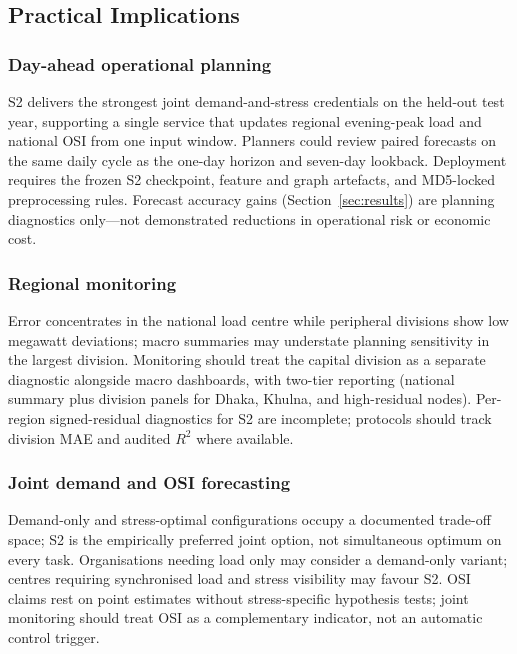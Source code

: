 \subsection{Practical Implications}\label{subsection:practical_implications}

\subsubsection{Day-ahead operational planning}\label{subsubsection:day_ahead_operational_planning}

S2 delivers the strongest joint demand-and-stress credentials on the held-out test year, supporting a single service that updates regional evening-peak load and national OSI from one input window. Planners could review paired forecasts on the same daily cycle as the one-day horizon and seven-day lookback. Deployment requires the frozen S2 checkpoint, feature and graph artefacts, and MD5-locked preprocessing rules. Forecast accuracy gains (Section~\ref{sec:results}) are planning diagnostics only---not demonstrated reductions in operational risk or economic cost.

\subsubsection{Regional monitoring}\label{subsubsection:regional_monitoring}

Error concentrates in the national load centre while peripheral divisions show low megawatt deviations; macro summaries may understate planning sensitivity in the largest division. Monitoring should treat the capital division as a separate diagnostic alongside macro dashboards, with two-tier reporting (national summary plus division panels for Dhaka, Khulna, and high-residual nodes). Per-region signed-residual diagnostics for S2 are incomplete; protocols should track division MAE and audited $R^2$ where available.

\subsubsection{Joint demand and OSI forecasting}\label{subsubsection:joint_demand_and_osi_forecasting}

Demand-only and stress-optimal configurations occupy a documented trade-off space; S2 is the empirically preferred joint option, not simultaneous optimum on every task. Organisations needing load only may consider a demand-only variant; centres requiring synchronised load and stress visibility may favour S2. OSI claims rest on point estimates without stress-specific hypothesis tests; joint monitoring should treat OSI as a complementary indicator, not an automatic control trigger.

